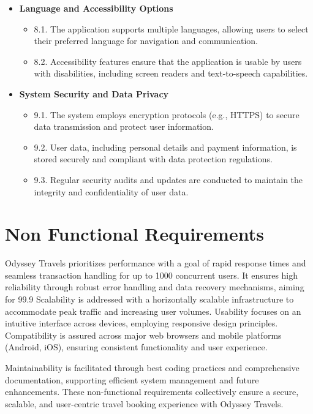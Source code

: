 \documentclass{scrreprt}
\begin{document}
\begin{itemize}
    \item \textbf{Language and Accessibility Options}
    \begin{itemize}
        \item 8.1. The application supports multiple languages, allowing users to select their preferred language for navigation and communication.
        \item 8.2. Accessibility features ensure that the application is usable by users with disabilities, including screen readers and text-to-speech capabilities.
    \end{itemize}
    
    \item \textbf{System Security and Data Privacy}
    \begin{itemize}
        \item 9.1. The system employs encryption protocols (e.g., HTTPS) to secure data transmission and protect user information.
        \item 9.2. User data, including personal details and payment information, is stored securely and compliant with data protection regulations.
        \item 9.3. Regular security audits and updates are conducted to maintain the integrity and confidentiality of user data.
    \end{itemize}
\end{itemize}

\section{Non Functional Requirements}
Odyssey Travels prioritizes performance with a goal of rapid response times and seamless transaction handling for up to 1000 concurrent users. It ensures high reliability through robust error handling and data recovery mechanisms, aiming for 99.9%
Scalability is addressed with a horizontally scalable infrastructure to accommodate peak traffic and increasing user volumes. Usability focuses on an intuitive interface across devices, employing responsive design principles. Compatibility is assured across major web browsers and mobile platforms (Android, iOS), ensuring consistent functionality and user experience.

Maintainability is facilitated through best coding practices and comprehensive documentation, supporting efficient system management and future enhancements. These non-functional requirements collectively ensure a secure, scalable, and user-centric travel booking experience with Odyssey Travels.
\end{document}
